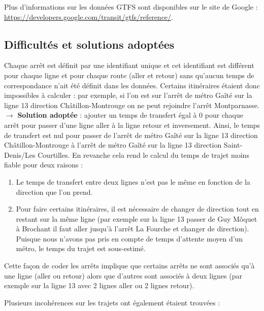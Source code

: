 \documentclass[,french]{article}
\begin{document}
Plus d'informations sur les données GTFS sont disponibles sur le site de
Google : \url{https://developers.google.com/transit/gtfs/reference/}.

\hypertarget{difficultuxe9s-et-solutions-adoptuxe9es}{%
\subsection{Difficultés et solutions
adoptées}\label{difficultuxe9s-et-solutions-adoptuxe9es}}

Chaque arrêt est définit par une identifiant unique et cet identifiant
est différent pour chaque ligne et pour chaque route (aller et retour)
sans qu'aucun temps de correspondance n'ait été définit dans les
données. Certains itinéraires étaient donc impossibles à calculer : par
exemple, si l'on est sur l'arrêt de métro Gaîté sur la ligne 13
direction Châtillon-Montrouge on ne peut rejoindre l'arrêt
Montparnasse.\\
\(\rightarrow\) \textbf{Solution adoptée} : ajouter un temps de
transfert égal à 0 pour chaque arrêt pour passer d'une ligne aller à la
ligne retour et inversement. Ainsi, le temps de transfert est nul pour
passer de l'arrêt de métro Gaîté sur la ligne 13 direction
Châtillon-Montrouge à l'arrêt de métro Gaîté sur la ligne 13 direction
Saint-Denis/Les Courtilles. En revanche cela rend le calcul du temps de
trajet moins fiable pour deux raisons :

\begin{enumerate}
\def\labelenumi{\arabic{enumi}.}
\item
  Le temps de transfert entre deux lignes n'est pas le même en fonction
  de la direction que l'on prend.
\item
  Pour faire certains itinéraires, il est nécessaire de changer de
  direction tout en restant sur la même ligne (par exemple sur la ligne
  13 passer de Guy Môquet à Brochant il faut aller jusqu'à l'arrêt La
  Fourche et changer de direction). Puisque nous n'avons pas pris en
  compte de temps d'attente moyen d'un métro, le temps du trajet est
  sous-estimé.
\end{enumerate}

Cette façon de coder les arrêts implique que certains arrêts ne sont
associés qu'à une ligne (aller ou retour) alors que d'autres sont
associés à deux lignes (par exemple sur la ligne 13 avec 2 lignes aller
ou 2 lignes retour).

Plusieurs incohérences sur les trajets ont également étaient trouvées :
\end{document}
